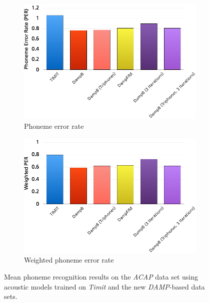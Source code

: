 \begin{figure}
	\centering
	\begin{subfigure}[t]{0.5\textwidth}
		\includegraphics[width=\textwidth]{images/res_phonerec_acap.png}
		\caption{Phoneme error rate}
		
	\end{subfigure}%
	\begin{subfigure}[t]{0.5\textwidth}
		\includegraphics[width=\textwidth]{images/res_phonerec_acap_w.png}
		\caption{Weighted phoneme error rate}
	\end{subfigure}
	\caption{Mean phoneme recognition results on the \textit{ACAP} data set using acoustic models trained on \textit{Timit} and the new \textit{DAMP}-based data sets.}\label{fig:res_phonerec_acap}
\end{figure}

